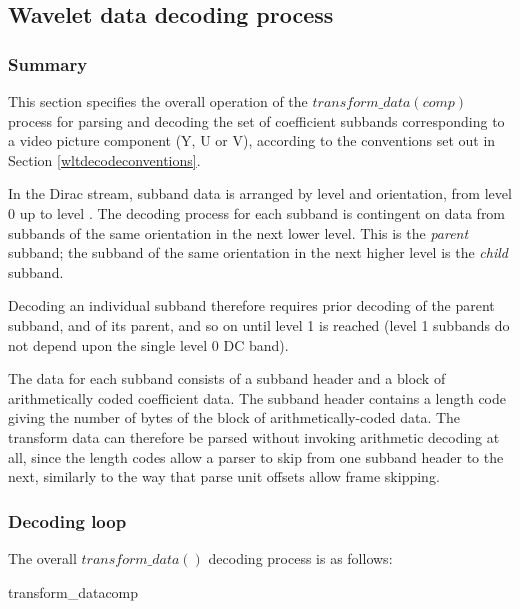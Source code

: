 \subsection{Wavelet data decoding process}

\subsubsection{Summary}

\label{transformdata}

This section specifies the overall operation of the $transform\_data(comp)$ process
for parsing and decoding the set of coefficient subbands corresponding
to a video picture component (Y, U or V), according to the conventions set out
in Section \ref{wltdecodeconventions}.

In the Dirac stream, subband data is arranged by level and orientation, from
level 0 up to level \TransformDepth. The decoding process for each subband is
contingent on data from subbands of the same orientation in the next lower level.
This is the {\em parent} subband; the subband of the same orientation in the next
higher level is the {\em child} subband. 

Decoding an individual subband therefore requires prior decoding of the parent subband,
and of its parent, and so on until level 1 is reached (level 1 subbands do not depend
upon the single level 0 DC band).

\begin{informative}
The data for each subband consists of a subband header and a block of arithmetically
coded coefficient data. The subband header contains a length code giving the number of
bytes of the block of arithmetically-coded data. The transform data can therefore be
parsed without invoking arithmetic decoding at all, since the length codes allow a 
parser to skip from one subband header to the next, similarly to the way that parse unit
offsets allow frame skipping.
\end{informative}

\subsubsection{Decoding loop}

The overall $transform\_data()$ decoding process is as follows:

\begin{pseudo}{transform\_data}{comp}
  \bsEND
\bsEND
{}
\end{pseudo}

